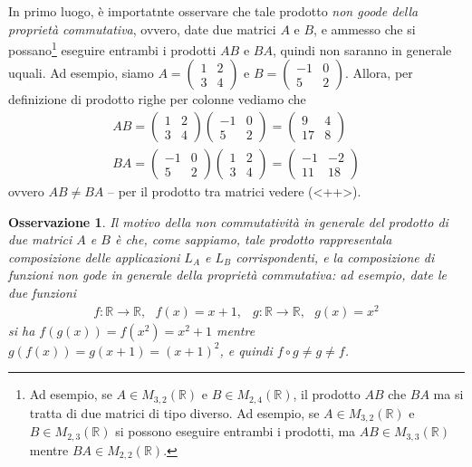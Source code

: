\documentclass{book}
\newtheorem{osservazione}{Osservazione}
\begin{document}
In primo luogo, è importatnte osservare che tale prodotto \textit{non goode della proprietà
  commutativa}, ovvero, date due matrici $A$ e $B$, e ammesso che si possano\footnote{Ad esempio,
  se $A\in M_{3,2}(\mathbb{R})$ e $B\in M_{2,4}(\mathbb{R})$, il prodotto $AB$ che $BA$ ma si
  tratta di due matrici di tipo diverso. Ad esempio, se $A\in M_{3,2}(\mathbb{R})$ e
  $B\in M_{2,3}(\mathbb{R})$ si possono eseguire entrambi i prodotti, ma $AB\in M_{3,3}
  (\mathbb{R})$ mentre $BA\in M_{2,2}(\mathbb{R})$.} eseguire entrambi i prodotti $AB$ e $BA$,
quindi non saranno in generale uquali. Ad esempio, siamo $A=
\begin{pmatrix}
  1 &2\\
  3 &4
\end{pmatrix}
$ e $B=
\begin{pmatrix}
  -1 & 0\\
  5 & 2
\end{pmatrix}
$. Allora, per definizione di prodotto righe per colonne vediamo che
\begin{eqnarray*}
  AB=
  \begin{pmatrix}
    1 &2\\
    3 &4
  \end{pmatrix}
  \begin{pmatrix}
    -1 &0\\
    5 & 2
  \end{pmatrix}=
  \begin{pmatrix}
    9& 4 \\
    17 & 8
  \end{pmatrix}\\
  BA=\begin{pmatrix}
    -1 &0\\
    5 & 2
  \end{pmatrix}
  \begin{pmatrix}
    1 &2\\
    3 &4
  \end{pmatrix}=
  \begin{pmatrix}
    -1 & -2\\
    11 & 18
  \end{pmatrix}
\end{eqnarray*}
ovvero $AB\neq BA$ --
per il prodotto tra matrici vedere (<++>).
\begin{osservazione}
  Il motivo della non commutatività in generale del prodotto di due matrici $A$ e $B$ è che,
  come sappiamo, tale prodotto rappresentala composizione delle applicazioni $L_A$ e $L_B$
  corrispondenti, e la composizione di funzioni non gode in generale della proprietà commutativa:
  ad esempio, date le due funzioni
  \begin{eqnarray*}
    f:\mathbb{R}\to \mathbb{R},\text{ } f(x)=x+1, & g:\mathbb{R}\to \mathbb{R},\text{ }g(x)=x^2
  \end{eqnarray*}
  si ha $f(g(x))=f(x^2)=x^2+1$ mentre $g(f(x))=g(x+1)=(x+1)^2$, e quindi $f\circ g\neq g\neq f$.
\end{osservazione}
\end{document}
